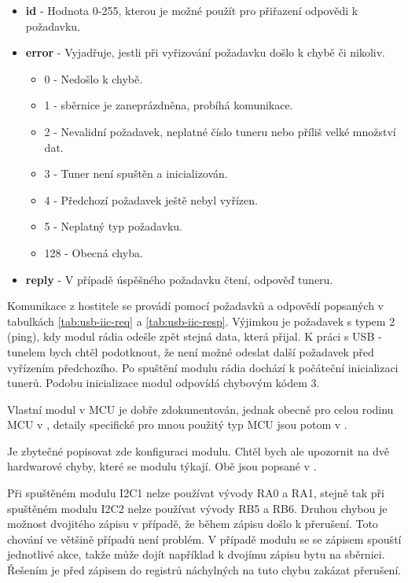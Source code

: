 \begin{itemize}
\item \textbf{id} - Hodnota 0-255, kterou je možné použít pro přiřazení odpovědi k požadavku.
\item {\textbf{error} - Vyjadřuje, jestli při vyřizování požadavku došlo k chybě či nikoliv. 
	\begin{itemize}
	\item 0 - Nedošlo k chybě.
	\item 1 - \iic sběrnice je zaneprázdněna, probíhá komunikace.
	\item 2 - Nevalidní požadavek, neplatné číslo tuneru nebo příliš velké množství dat.
	\item 3 - Tuner není spuštěn a inicializován.
	\item 4 - Předchozí požadavek ještě nebyl vyřízen.
	\item 5 - Neplatný typ požadavku.
	\item 128 - Obecná chyba.
	\end{itemize}
}
\item \textbf{reply} - V případě úspěšného požadavku čtení, odpověď tuneru.
\end{itemize} 

Komunikace z hostitele se provádí pomocí požadavků a odpovědí popsaných v tabulkách \ref{tab:usb-iic-req} a \ref{tab:usb-iic-resp}. Výjimkou je požadavek s typem 2 (ping), kdy modul rádia odešle zpět stejná data, která přijal. K práci s USB - \iic tunelem bych chtěl podotknout, že není možné odeslat další požadavek před vyřízením předchozího. Po spuštění modulu rádia dochází k počáteční inicializaci tunerů. Podobu inicializace modul odpovídá chybovým kódem 3.

Vlastní modul \iic v MCU je dobře zdokumentován, jednak obecně pro celou rodinu MCU v \cite{pic-iic}, detaily specifické pro mnou použitý typ MCU jsou potom v \cite{pic}.

Je zbytečné popisovat zde konfiguraci \iic modulu. Chtěl bych ale upozornit na dvě hardwarové chyby, které se modulu týkají. Obě jsou popsané v \cite{pic-errata}.

Při spuštěném modulu I2C1 nelze používat vývody RA0 a RA1, stejně tak při spuštěném modulu I2C2 nelze používat vývody RB5 a RB6. 
Druhou chybou je možnost dvojitého zápisu v případě, že během zápisu došlo k přerušení. Toto chování ve většině případů není problém. V případě \iic modulu se se zápisem spouští jednotlivé akce, takže může dojít například k dvojímu zápisu bytu na sběrnici. Řešením je před zápisem do registrů náchylných na tuto chybu zakázat přerušení.


